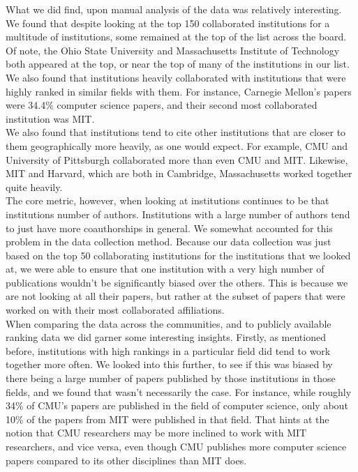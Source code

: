 \documentclass[times, 10pt,twocolumn]{article}
\begin{document}
What we did find, upon manual analysis of the data was relatively interesting. We found that despite looking at the top 150 collaborated institutions for a multitude of institutions, some remained at the top of the list across the board. Of note, the Ohio State University and Massachusetts Institute of Technology both appeared at the top, or near the top of many of the institutions in our list. We also found that institutions heavily collaborated with institutions that were highly ranked in similar fields with them. For instance, Carnegie Mellon’s papers were 34.4\% computer science papers, and their second most collaborated institution was MIT. \\

We also found that institutions tend to cite other institutions that are closer to them geographically more heavily, as one would expect. For example, CMU and University of Pittsburgh collaborated more than even CMU and MIT. Likewise, MIT and Harvard, which are both in Cambridge, Massachusetts worked together quite heavily. \\

The core metric, however, when looking at institutions continues to be that institutions number of authors. Institutions with a large number of authors tend to just have more coauthorships in general.  We somewhat accounted for this problem in the data collection method. Because our data collection was just based on the top 50 collaborating institutions for the institutions that we looked at, we were able to ensure that one institution with a very high number of publications wouldn’t be significantly biased over the others. This is because we are not looking at all their papers, but rather at the subset of papers that were worked on with their most collaborated affiliations. \\

When comparing the data across the communities, and to publicly available ranking data we did garner some interesting insights. Firstly, as mentioned before, institutions with high rankings in a particular field did tend to work together more often. We looked into this further, to see if this was biased by there being a large number of papers published by those institutions in those fields, and we found that wasn’t necessarily the case. For instance, while roughly 34\% of CMU’s papers are published in the field of computer science, only about 10\% of the papers from MIT were published in that field. That hints at the notion that CMU researchers may be more inclined to work with MIT researchers, and vice versa, even though CMU publishes more computer science papers compared to its other disciplines than MIT does. \\
\end{document}
